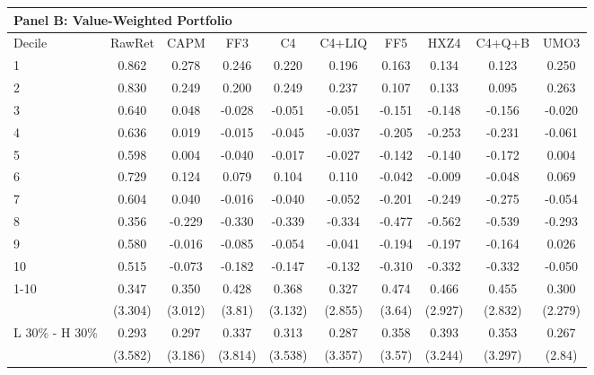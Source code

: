 \begin{tabular}{lccccccccc}
\hline
\multicolumn{10}{l}{Panel B: Value-Weighted Portfolio} \bigstrut\\
\hline
Decile  & RawRet  & CAPM    & FF3     & C4      & C4+LIQ  & FF5     & HXZ4    & C4+Q+B  & UMO3 \bigstrut\\
\hline
1       & 0.862   & 0.278   & 0.246   & 0.220   & 0.196   & 0.163   & 0.134   & 0.123   & 0.250 \bigstrut[t]\\
2       & 0.830   & 0.249   & 0.200   & 0.249   & 0.237   & 0.107   & 0.133   & 0.095   & 0.263 \\
3       & 0.640   & 0.048   & -0.028  & -0.051  & -0.051  & -0.151  & -0.148  & -0.156  & -0.020 \\
4       & 0.636   & 0.019   & -0.015  & -0.045  & -0.037  & -0.205  & -0.253  & -0.231  & -0.061 \\
5       & 0.598   & 0.004   & -0.040  & -0.017  & -0.027  & -0.142  & -0.140  & -0.172  & 0.004 \\
6       & 0.729   & 0.124   & 0.079   & 0.104   & 0.110   & -0.042  & -0.009  & -0.048  & 0.069 \\
7       & 0.604   & 0.040   & -0.016  & -0.040  & -0.052  & -0.201  & -0.249  & -0.275  & -0.054 \\
8       & 0.356   & -0.229  & -0.330  & -0.339  & -0.334  & -0.477  & -0.562  & -0.539  & -0.293 \\
9       & 0.580   & -0.016  & -0.085  & -0.054  & -0.041  & -0.194  & -0.197  & -0.164  & 0.026 \\
10      & 0.515   & -0.073  & -0.182  & -0.147  & -0.132  & -0.310  & -0.332  & -0.332  & -0.050 \bigstrut[b]\\
\hline
\multirow{2}[1]{*}{1-10} & 0.347   & 0.350   & 0.428   & 0.368   & 0.327   & 0.474   & 0.466   & 0.455   & 0.300 \bigstrut[t]\\
        & (3.304) & (3.012) & (3.81)  & (3.132) & (2.855) & (3.64)  & (2.927) & (2.832) & (2.279) \\
\multicolumn{1}{l}{\multirow{2}[1]{*}{L 30\% - H 30\%}} & 0.293   & 0.297   & 0.337   & 0.313   & 0.287   & 0.358   & 0.393   & 0.353   & 0.267 \\
        & (3.582) & (3.186) & (3.814) & (3.538) & (3.357) & (3.57)  & (3.244) & (3.297) & (2.84) \bigstrut[b]\\
\hline
\hline
\end{tabular}%
